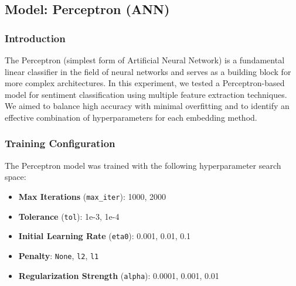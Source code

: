 \subsection{Model: Perceptron (ANN)}

\subsubsection{Introduction}

The Perceptron (simplest form of Artificial Neural Network) is a fundamental linear classifier in the field of neural networks and serves as a building block for more complex architectures. In this experiment, we tested a Perceptron-based model for sentiment classification using multiple feature extraction techniques. We aimed to balance high accuracy with minimal overfitting and to identify an effective combination of hyperparameters for each embedding method.

\subsubsection{Training Configuration}

The Perceptron model was trained with the following hyperparameter search space:

\begin{itemize}
    \item \textbf{Max Iterations} (\texttt{max\_iter}): 1000, 2000
    \item \textbf{Tolerance} (\texttt{tol}): 1e-3, 1e-4
    \item \textbf{Initial Learning Rate} (\texttt{eta0}): 0.001, 0.01, 0.1
    \item \textbf{Penalty}: \texttt{None}, \texttt{l2}, \texttt{l1}
    \item \textbf{Regularization Strength} (\texttt{alpha}): 0.0001, 0.001, 0.01
\end{itemize}



